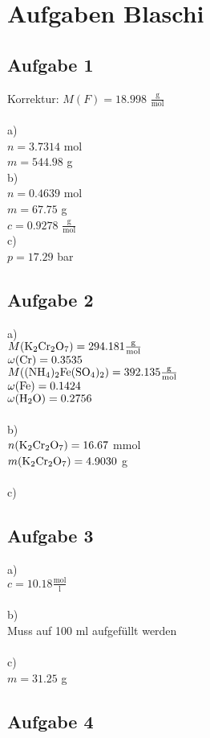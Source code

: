 \documentclass[a4paper]{article}
\begin{document}
\section{Aufgaben Blaschi}
\subsection*{Aufgabe 1}
Korrektur: $M(F) = 18.998$ $\mathrm{\frac{g}{mol}}$\\\\
a)\\$n = 3.7314$ mol\\$m = 544.98$ g\\
b)\\$n=0.4639$ mol\\$m = 67.75$ g\\$c=0.9278$ $\mathrm{\frac{g}{mol}}$\\
c)\\$p = 17.29$ bar
\subsection*{Aufgabe 2}
a)\\$M(\ce{K2Cr2O7})=294.181 \mathrm{\frac{g}{mol}}$\\$\omega(\ce{Cr})=0.3535$\\$M(\ce{(NH4)2Fe(SO4)2})=392.135 \mathrm{\frac{g}{mol}}$\\$\omega(\ce{Fe})=0.1424$\\$\omega(\ce{H2O})=0.2756$\\\\
b)\\$n(\ce{K2Cr2O7}) = 16.67$ mmol\\$m(\ce{K2Cr2O7}) = 4.9030$ g\\\\
c)\\
\newpage
\subsection*{Aufgabe 3}
a)\\$c=10.18 \mathrm{\frac{mol}{l}}$\\\\
b)\\Muss auf 100 ml aufgefüllt werden\\\\
c)\\$m = 31.25$ g
\subsection*{Aufgabe 4}
\end{document}
